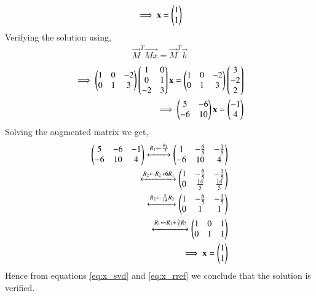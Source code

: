 \documentclass[journal,12pt,twocolumn]{IEEEtran}
\begin{document}
\begin{align}
\implies \mathbf{x} = \begin{pmatrix}1 \\ 1 \end{pmatrix} \label{eq:x_svd}
\end{align}
Verifying the solution using,
\begin{align}
\vec{M}^T\vec{Mx} = \vec{M}^T\vec{b}
\end{align}
\begin{align}
\implies \begin{pmatrix}1&0&-2\\0&1&3\end{pmatrix} \begin{pmatrix}1&0\\0&1\\-2&3\end{pmatrix} \mathbf{x} = \begin{pmatrix}1&0&-2\\0&1&3\end{pmatrix}\begin{pmatrix}3\\-2\\2\end{pmatrix}\\
\implies \begin{pmatrix}5&-6\\-6&10\end{pmatrix}\mathbf{x} = \begin{pmatrix}-1\\4\end{pmatrix}
\end{align}
Solving the augmented matrix we get,
\begin{align}
\begin{pmatrix}5&-6&-1\\-6&10&4\end{pmatrix}\xleftrightarrow[]{R_1\leftarrow\frac{R_1}{5}}\begin{pmatrix}1&-\frac{6}{5}&-\frac{1}{5}\\-6&10&4\end{pmatrix}\\
\xleftrightarrow[]{R_2\leftarrow R_2+6R_1}\begin{pmatrix}1&-\frac{6}{5}&-\frac{1}{5}\\0&\frac{14}{5}&\frac{14}{5}\end{pmatrix}\\
\xleftrightarrow[]{R_2\leftarrow \frac{5}{14}R_2}\begin{pmatrix}1&-\frac{6}{5}&-\frac{1}{5}\\0&1&1\end{pmatrix}\\
\xleftrightarrow[]{R_1\leftarrow R_1+\frac{6}{5}R_2}\begin{pmatrix}1&0&1\\0&1&1\end{pmatrix}\\
\implies \mathbf{x} = \begin{pmatrix}1\\1 \end{pmatrix}\label{eq:x_rref}
\end{align}
Hence from equations \eqref{eq:x_svd} and \eqref{eq:x_rref} we conclude that the solution is verified.  
\end{document}
